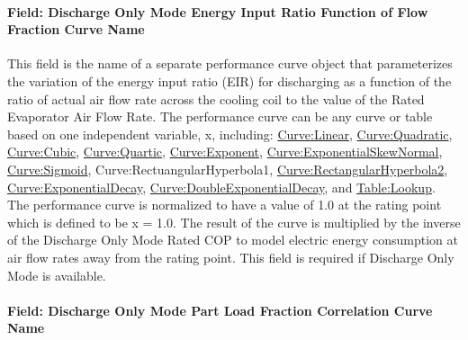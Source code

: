 \paragraph{Field: Discharge Only Mode Energy Input Ratio Function of Flow Fraction Curve Name}\label{field-discharge-only-mode-energy-input-ratio-function-of-flow-fraction-curve-name}

This field is the name of a separate performance curve object that parameterizes the variation of the energy input ratio (EIR) for discharging as a function of the ratio of actual air flow rate across the cooling coil to the value of the Rated Evaporator Air Flow Rate. The performance curve can be any curve or table based on one independent variable, x, including: \hyperref[curvelinear]{Curve:Linear}, \hyperref[curvequadratic]{Curve:Quadratic}, \hyperref[curvecubic]{Curve:Cubic}, \hyperref[curvequartic]{Curve:Quartic}, \hyperref[curveexponent]{Curve:Exponent}, \hyperref[curveexponentialskewnormal]{Curve:ExponentialSkewNormal}, \hyperref[curvesigmoid]{Curve:Sigmoid}, Curve:RectuangularHyperbola1, \hyperref[curverectangularhyperbola2]{Curve:RectangularHyperbola2}, \hyperref[curveexponentialdecay]{Curve:ExponentialDecay}, \hyperref[curvedoubleexponentialdecay]{Curve:DoubleExponentialDecay}, and \hyperref[tablelookup]{Table:Lookup}. The performance curve is normalized to have a value of 1.0 at the rating point which is defined to be x = 1.0. The result of the curve is multiplied by the inverse of the Discharge Only Mode Rated COP to model electric energy consumption at air flow rates away from the rating point. This field is required if Discharge Only Mode is available.

\paragraph{Field: Discharge Only Mode Part Load Fraction Correlation Curve Name}\label{field-discharge-only-mode-part-load-fraction-correlation-curve-name}

